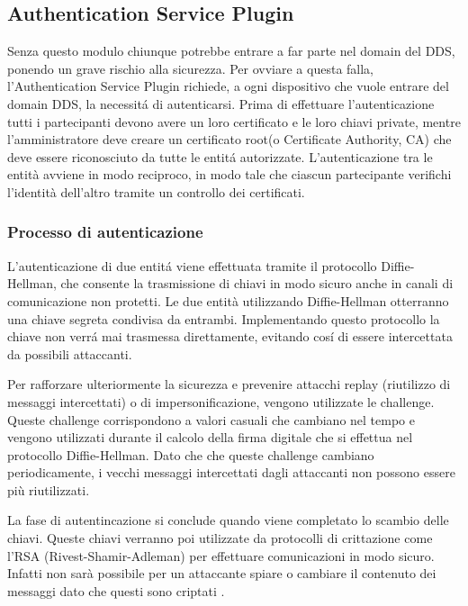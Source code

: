 \subsection{Authentication Service Plugin}
Senza questo modulo chiunque potrebbe entrare a far parte nel domain
del DDS, ponendo un grave rischio alla sicurezza. Per ovviare a questa
falla, l'Authentication Service Plugin richiede, a ogni dispositivo che 
vuole entrare del domain DDS, la necessitá di autenticarsi.
Prima di effettuare l'autenticazione tutti i partecipanti devono 
avere un loro certificato e le loro chiavi private, mentre 
l'amministratore deve creare un certificato root(o Certificate Authority, CA) 
che deve essere riconosciuto da tutte le entitá autorizzate. 
L'autenticazione tra le entità avviene in modo reciproco, 
in modo tale che ciascun partecipante verifichi l'identità dell'altro
tramite un controllo dei certificati.


\subsubsection{Processo di autenticazione}
L'autenticazione di due entitá viene effettuata
tramite il protocollo Diffie-Hellman, che consente la trasmissione 
di chiavi in modo sicuro anche in canali di comunicazione non protetti.
Le due entità utilizzando Diffie-Hellman otterranno una chiave 
segreta condivisa da entrambi. Implementando questo 
protocollo la chiave non verrá mai 
trasmessa direttamente, evitando cosí di essere intercettata da 
possibili attaccanti. 

Per rafforzare ulteriormente la sicurezza e prevenire attacchi replay 
(riutilizzo di messaggi intercettati) o di impersonificazione, vengono 
utilizzate le challenge. Queste challenge corrispondono a valori 
casuali che cambiano nel tempo e vengono utilizzati durante il 
calcolo della firma digitale che si effettua nel protocollo
Diffie-Hellman.
Dato che che queste challenge cambiano periodicamente,
i vecchi messaggi intercettati dagli attaccanti non possono essere 
più riutilizzati.

La fase di autentincazione si conclude quando viene completato
lo scambio delle chiavi.
Queste chiavi verranno poi utilizzate da protocolli di 
crittazione come l'RSA (Rivest-Shamir-Adleman) per effettuare 
comunicazioni in modo sicuro. Infatti non sarà possibile per un 
attaccante spiare o cambiare il contenuto dei messaggi dato 
che questi sono criptati 
\cite{DBLP:conf/asiaccs/WangLG24}.
\label{Processo di autenticazione}

